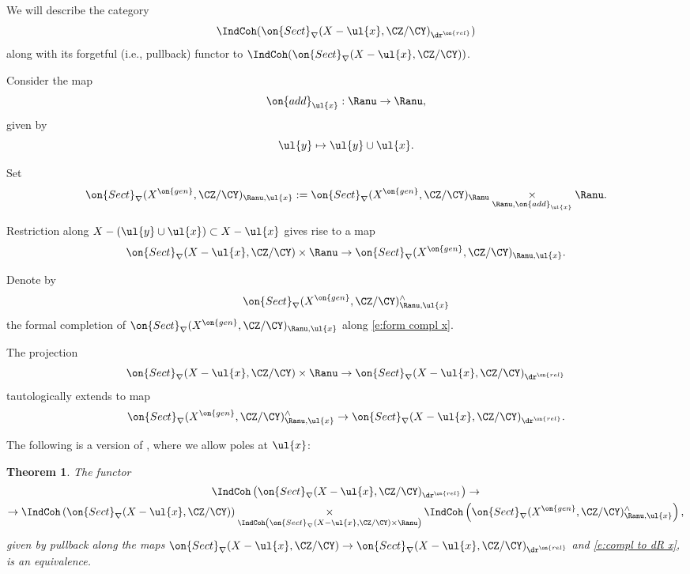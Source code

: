 \documentclass[9pt]{amsart}
\newtheorem{thm}[subsubsection]{Theorem}
\theoremstyle{remark}
\theoremstyle{definition}
\theoremstyle{remark}
\numberwithin{equation}{section}
\begin{document}
\medskip

We will describe the category
$$\IndCoh(\on{Sect}_\nabla(X-\ul{x},\CZ/\CY)_{\dr^{\on{rel}}})$$
along with its forgetful (i.e., pullback) functor to $\IndCoh(\on{Sect}_\nabla(X-\ul{x},\CZ/\CY))$. 

\sssec{}

Consider the map 
$$\on{add}_{\ul{x}}:\Ranu\to \Ranu,$$
given by 
$$\ul{y}\mapsto \ul{y}\cup \ul{x}.$$

\medskip

Set
$$\on{Sect}_\nabla(X^{\on{gen}},\CZ/\CY)_{\Ranu,\ul{x}}:=
\on{Sect}_\nabla(X^{\on{gen}},\CZ/\CY)_\Ranu \underset{\Ranu,\on{add}_{\ul{x}}}\times \Ranu.$$

Restriction along $X-(\ul{y}\cup \ul{x})\subset X-\ul{x}$ gives rise to a map
\begin{equation} \label{e:form compl x}
\on{Sect}_\nabla(X-\ul{x},\CZ/\CY)\times \Ranu\to \on{Sect}_\nabla(X^{\on{gen}},\CZ/\CY)_{\Ranu,\ul{x}}.
\end{equation}

\sssec{}

Denote by 
$$\on{Sect}_\nabla(X^{\on{gen}},\CZ/\CY)^\wedge_{\Ranu,\ul{x}}$$
the formal completion of $\on{Sect}_\nabla(X^{\on{gen}},\CZ/\CY)_{\Ranu,\ul{x}}$ along \eqref{e:form compl x}. 

\medskip

The projection
$$\on{Sect}_\nabla(X-\ul{x},\CZ/\CY)\times \Ranu\to \on{Sect}_\nabla(X-\ul{x},\CZ/\CY)_{\dr^{\on{rel}}}$$
tautologically extends to map 
\begin{equation} \label{e:compl to dR x}
\on{Sect}_\nabla(X^{\on{gen}},\CZ/\CY)^\wedge_{\Ranu,\ul{x}}\to \on{Sect}_\nabla(X-\ul{x},\CZ/\CY)_{\dr^{\on{rel}}}.
\end{equation} 

\sssec{}

The following is a version of \cite[Corollary 4.6.10]{Ro}, where we allow poles at $\ul{x}$:

\begin{thm} \label{t:Nick x}
The functor
\begin{multline*}
\IndCoh\left(\on{Sect}_\nabla(X-\ul{x},\CZ/\CY)_{\dr^{\on{rel}}}\right)\to \\
\to \IndCoh\left(\on{Sect}_\nabla(X-\ul{x},\CZ/\CY)\right)\underset{\IndCoh\left(\on{Sect}_\nabla(X-\ul{x},\CZ/\CY)\times \Ranu\right)}\times 
\IndCoh\left(\on{Sect}_\nabla(X^{\on{gen}},\CZ/\CY)^\wedge_{\Ranu,\ul{x}}\right),
\end{multline*}
given by pullback along the maps $\on{Sect}_\nabla(X-\ul{x},\CZ/\CY)\to \on{Sect}_\nabla(X-\ul{x},\CZ/\CY)_{\dr^{\on{rel}}}$ and \eqref{e:compl to dR x},
is an equivalence. 
\end{thm}
\end{document}
